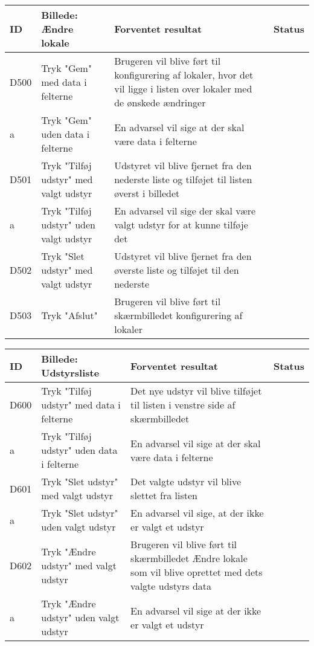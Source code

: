 \begin{tabularx}{\textwidth}{ |X|X|X|X| }
\hline
	ID & Billede: Ændre lokale  & Forventet resultat & Status\\ 
\hline
	D500 & Tryk "Gem" med data i felterne & Brugeren vil blive ført til konfigurering af lokaler, hvor det vil ligge i listen over lokaler med de ønskede ændringer  & \\
\hline
	a & Tryk "Gem" uden data i felterne & En advarsel vil sige at der skal være data i felterne & \\
\hline
	D501 & Tryk "Tilføj udstyr" med valgt udstyr & Udstyret vil blive fjernet fra den nederste liste og tilføjet til listen øverst i billedet & \\
\hline
	a & Tryk "Tilføj udstyr" uden valgt udstyr & En advarsel vil sige der skal være valgt udstyr for at kunne tilføje det & \\
\hline
	D502 & Tryk "Slet udstyr" med valgt udstyr & Udstyret vil blive fjernet fra den øverste liste og tilføjet til den nederste  & \\
\hline
	D503 & Tryk "Afslut" & Brugeren vil blive ført til skærmbilledet konfigurering af lokaler & \\
\hline
\end{tabularx}

\begin{tabularx}{\textwidth}{ |X|X|X|X| }
\hline
	ID & Billede: Udstyrsliste  & Forventet resultat & Status\\ 
\hline
	D600 & Tryk "Tilføj udstyr" med data i felterne & Det nye udstyr vil blive tilføjet til listen i venstre side af skærmbilledet & \\
\hline
	a & Tryk "Tilføj udstyr" uden data i felterne & En advarsel vil sige at der skal være data i felterne & \\
\hline
	D601 & Tryk "Slet udstyr" med valgt udstyr & Det valgte udstyr vil blive slettet fra listen & \\
\hline
	a & Tryk "Slet udstyr" uden valgt udstyr & En advarsel vil sige, at der ikke er valgt et udstyr & \\
\hline
	D602 & Tryk "Ændre udstyr" med valgt udstyr & Brugeren vil blive ført til skærmbilledet Ændre lokale som vil blive oprettet med dets valgte udstyrs data & \\
\hline
	a & Tryk "Ændre udstyr" uden valgt udstyr & En advarsel vil sige at der ikke er valgt et udstyr & \\
\hline
\end{tabularx}

